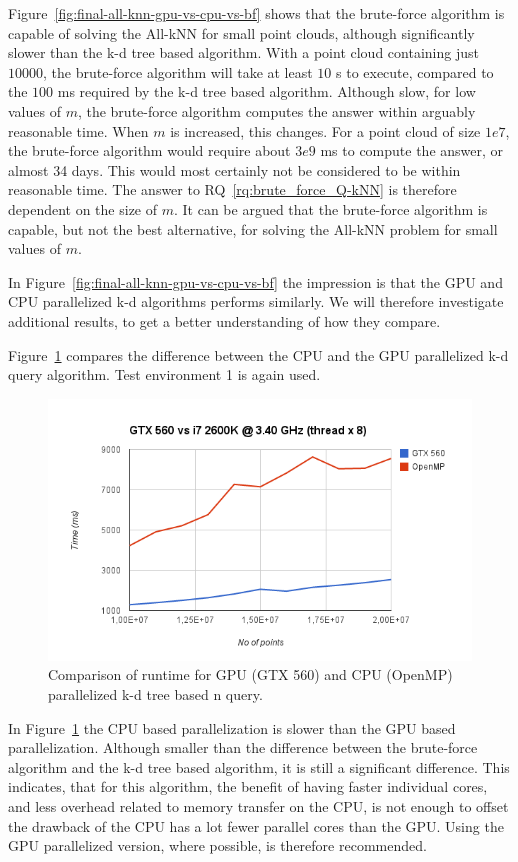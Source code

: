 Figure~\ref{fig:final-all-knn-gpu-vs-cpu-vs-bf} shows that the brute-force algorithm is capable of solving the All-kNN for small point clouds, although significantly slower than the k-d tree based algorithm. With a point cloud containing just $10000$, the brute-force algorithm will take at least $10$ s to execute, compared to the $100$ ms required by the k-d tree based algorithm. Although slow, for low values of $m$, the brute-force algorithm computes the answer within arguably reasonable time. When $m$ is increased, this changes. For a point cloud of size $1e7$, the brute-force algorithm would require about $3e9$ ms to compute the answer, or almost 34 days. This would most certainly not be considered to be within reasonable time. The answer to RQ~\ref{rq:brute_force_Q-kNN} is therefore dependent on the size of $m$. It can be argued that the brute-force algorithm is capable, but not the best alternative, for solving the All-kNN problem for small values of $m$.

In Figure~\ref{fig:final-all-knn-gpu-vs-cpu-vs-bf} the impression is that the GPU and CPU parallelized k-d algorithms performs similarly. We will therefore investigate additional results, to get a better understanding of how they compare.

Figure~\ref{fig:v17-gpu-vs-cpu} compares the difference between the CPU and the GPU parallelized k-d query algorithm. Test environment 1 is again used.

\begin{figure}[ht!]
    \centering
    \includegraphics[width=120mm]{../gfx/v17-gpu-vs-cpu.png}
    \caption{Comparison of runtime for GPU (GTX 560) and CPU (OpenMP) parallelized k-d tree based n query.}
    \label{fig:v17-gpu-vs-cpu}
\end{figure}

In Figure~\ref{fig:v17-gpu-vs-cpu} the CPU based parallelization is slower than the GPU based parallelization. Although smaller than the difference between the brute-force algorithm and the k-d tree based algorithm, it is still a significant difference. This indicates, that for this algorithm, the benefit of having faster individual cores, and less overhead related to memory transfer on the CPU, is not enough to offset the drawback of the CPU has a lot fewer parallel cores than the GPU\@. Using the GPU parallelized version, where possible, is therefore recommended.

